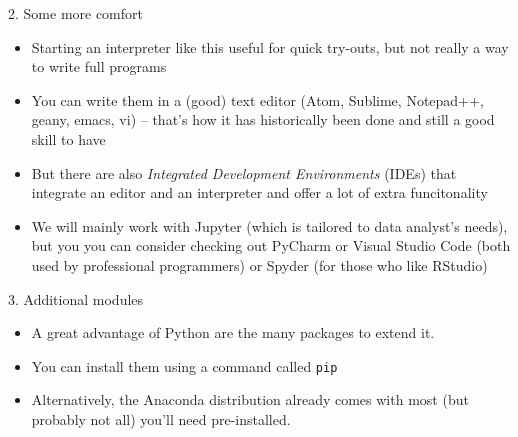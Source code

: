 \begin{frame}{2. Some more comfort}
\begin{itemize}[<+->]
	\item Starting an interpreter like this useful for quick try-outs, but not really a way to write full programs
	\item You can write them in a (good) text editor (Atom, Sublime, Notepad++, geany, emacs, vi) -- that's how it has historically been done and still a good skill to have
	\item But there are also \emph{Integrated Development Environments} (IDEs) that integrate an editor and an interpreter and offer a lot of extra funcitonality
	\item We will mainly work with Jupyter (which is tailored to data analyst's needs), but you you can consider checking out PyCharm or Visual Studio Code (both used by professional programmers) or Spyder (for those who like RStudio)
\end{itemize}
\end{frame}

\begin{frame}{3. Additional modules}
	\begin{itemize}
		\item A great advantage of Python are the many packages to extend it. 
		\item You can install them using a command called \texttt{pip}
		\item Alternatively, the Anaconda distribution already comes with most (but probably not all) you'll need pre-installed.
	\end{itemize}
\end{frame}

